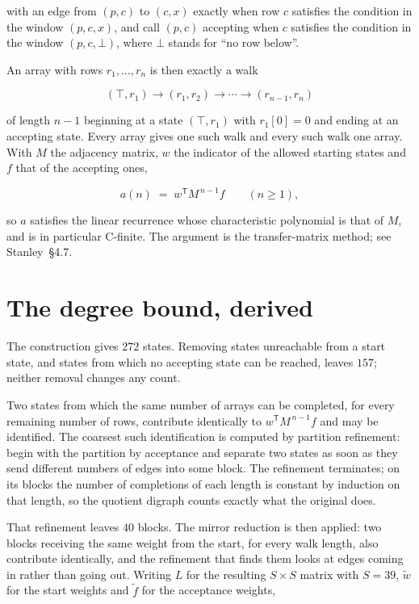 \documentclass[11pt]{article}
\theoremstyle{definition}
\begin{document}
with an edge from $(p,c)$ to $(c,x)$ exactly when row $c$ satisfies the condition in the window $(p,c,x)$, and call $(p,c)$ accepting when $c$ satisfies the condition in the window $(p,c,\bot)$, where $\bot$ stands for ``no row below''.

An array with rows $r_1,\dots,r_n$ is then exactly a walk

\[(\top,r_1) \to (r_1,r_2) \to \cdots \to (r_{n-1},r_n)\]

of length $n-1$ beginning at a state $(\top,r_1)$ with $r_1[0]=0$ and ending at an accepting state. Every array gives one such walk and every such walk one array. With $M$ the adjacency matrix, $w$ the indicator of the allowed starting states and $f$ that of the accepting ones,

\[a(n) \;=\; w^{\mathsf T} M^{\,n-1} f \qquad (n \ge 1),\]

so $a$ satisfies the linear recurrence whose characteristic polynomial is that of $M$, and is in particular C-finite. The argument is the transfer-matrix method; see Stanley~\S4.7.

\section{The degree bound, derived}

The construction gives $272$ states. Removing states unreachable from a start state, and states from which no accepting state can be reached, leaves $157$; neither removal changes any count.

Two states from which the same number of arrays can be completed, for every remaining number of rows, contribute identically to $w^{\mathsf T}M^{\,n-1}f$ and may be identified. The coarsest such identification is computed by partition refinement: begin with the partition by acceptance and separate two states as soon as they send different numbers of edges into some block. The refinement terminates; on its blocks the number of completions of each length is constant by induction on that length, so the quotient digraph counts exactly what the original does.

That refinement leaves $40$ blocks. The mirror reduction is then applied: two blocks receiving the same weight from the start, for every walk length, also contribute identically, and the refinement that finds them looks at edges coming in rather than going out. Writing $L$ for the resulting $S \times S$ matrix with $S = 39$, $\tilde w$ for the start weights and $\tilde f$ for the acceptance weights,
\end{document}
